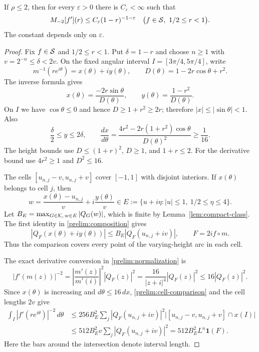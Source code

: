 \begin{proposition}
\label{prop:disk-transfer}
If $\rho\le2$, then for every $\varepsilon>0$ there is
$C_\varepsilon<\infty$ such that
\begin{equation}
 M_{-2}[f'](r)\le C_\varepsilon(1-r)^{-1-\varepsilon}
 \quad\bigl(f\in\mathcal S,\ 1/2\le r<1\bigr).
 \label{prelim:uniform-disk}
\end{equation}
The constant depends only on $\varepsilon$.
\end{proposition}

\begin{proof}
Fix $f\in\mathcal S$ and $1/2\le r<1$.  Put $\delta=1-r$ and choose
$n\ge1$ with $v=2^{-n}\le\delta<2v$.  On the fixed angular interval
$I=[3\pi/4,5\pi/4]$, write
\[
 m^{-1}(re^{i\theta})=x(\theta)+iy(\theta),\qquad
 D(\theta)=1-2r\cos\theta+r^2.
\]
The inverse formula gives
\begin{equation}
 x(\theta)=\frac{-2r\sin\theta}{D(\theta)},\qquad
 y(\theta)=\frac{1-r^2}{D(\theta)}.
 \label{prelim:arc-coordinates}
\end{equation}
On $I$ we have $\cos\theta\le0$ and hence $D\ge1+r^2\ge2r$;
therefore $|x|\le|\sin\theta|<1$.  Also
\[
 \frac\delta2\le y\le2\delta,\qquad
 \frac{dx}{d\theta}
 =\frac{4r^2-2r(1+r^2)\cos\theta}{D(\theta)^2}
 \ge\frac1{16}.
\]
The height bounds use $D\le(1+r)^2$, $D\ge1$, and $1+r\le2$.
For the derivative bound use $4r^2\ge1$ and $D^2\le16$.

The cells $[u_{n,j}-v,u_{n,j}+v]$ cover $[-1,1]$ with disjoint
interiors.  If $x(\theta)$ belongs to cell $j$, then
\[
 w=\frac{x(\theta)-u_{n,j}}v+i\frac{y(\theta)}v
 \in E:=\{u+i\eta:|u|\le1,\ 1/2\le\eta\le4\}.
\]
Let $B_E=\max_{G\in\mathcal K,\,w\in E}|Q_G(w)|$, which is finite by
Lemma~\ref{lem:compact-class}.  The first identity in
\eqref{prelim:composition} gives
\begin{equation}
 |Q_F(x(\theta)+iy(\theta))|
 \le B_E|Q_F(u_{n,j}+iv)|,
 \qquad F=2i f\circ m.
 \label{prelim:cell-comparison}
\end{equation}
Thus the comparison covers every point of the varying-height arc in
each cell.

The exact derivative conversion in \eqref{prelim:normalization} is
\[
 |f'(m(z))|^{-2}
 =\left|\frac{m'(z)}{m'(i)}\right|^2|Q_F(z)|^2
 =\frac{16}{|z+i|^4}|Q_F(z)|^2
 \le16|Q_F(z)|^2.
\]
Since $x(\theta)$ is increasing and $d\theta\le16\,dx$,
\eqref{prelim:cell-comparison} and the cell lengths $2v$ give
\begin{align*}
 \int_I|f'(re^{i\theta})|^{-2}\,d\theta
 &\le256B_E^2\sum_j|Q_F(u_{n,j}+iv)|^2
       \bigl|[u_{n,j}-v,u_{n,j}+v]\cap x(I)\bigr|\\
 &\le512B_E^2 v\sum_j|Q_F(u_{n,j}+iv)|^2
 =512B_E^2 L^n\mathbf1(F).
\end{align*}
Here the bars around the intersection denote interval length.


\end{proof}
